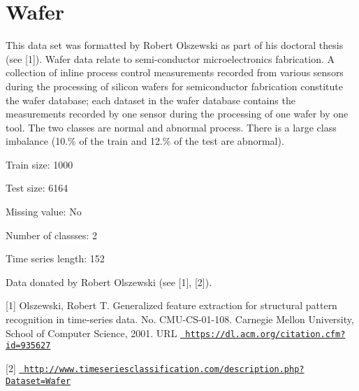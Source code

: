 \chapter{Wafer}
\hypertarget{md_external_2data_2UCRArchive__2018_2Wafer_2README}{}\label{md_external_2data_2UCRArchive__2018_2Wafer_2README}
\label{md_external_2data_2UCRArchive__2018_2Wafer_2README_autotoc_md229}%
%
 This data set was formatted by Robert Olszewski as part of his doctoral thesis (see \mbox{[}1\mbox{]}). Wafer data relate to semi-\/conductor microelectronics fabrication. A collection of inline process control measurements recorded from various sensors during the processing of silicon wafers for semiconductor fabrication constitute the wafer database; each dataset in the wafer database contains the measurements recorded by one sensor during the processing of one wafer by one tool. The two classes are normal and abnormal process. There is a large class imbalance (10.\% of the train and 12.\% of the test are abnormal).

Train size\+: 1000

Test size\+: 6164

Missing value\+: No

Number of classses\+: 2

Time series length\+: 152

Data donated by Robert Olszewski (see \mbox{[}1\mbox{]}, \mbox{[}2\mbox{]}).

\mbox{[}1\mbox{]} Olszewski, Robert T. Generalized feature extraction for structural pattern recognition in time-\/series data. No. CMU-\/\+CS-\/01-\/108. Carnegie Mellon University, School of Computer Science, 2001. URL \href{https://dl.acm.org/citation.cfm?id=935627}{\texttt{ https\+://dl.\+acm.\+org/citation.\+cfm?id=935627}}

\mbox{[}2\mbox{]} \href{http://www.timeseriesclassification.com/description.php?Dataset=Wafer}{\texttt{ http\+://www.\+timeseriesclassification.\+com/description.\+php?\+Dataset=\+Wafer}} 